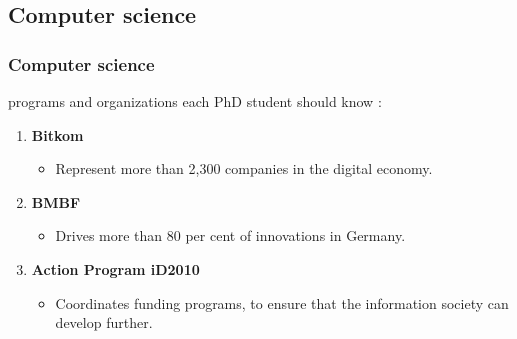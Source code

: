 \documentclass[9pt, compress]{beamer}
\begin{document}
    \subsection{Computer science} 
    \begin{frame} 
        \frametitle{Computer science}
        programs and organizations  each PhD student should know :
        \begin{enumerate}
            \setcounter{enumi}{0}
            \item \textbf{Bitkom}
            \begin{itemize}
                \item  Represent more than 2,300 companies in the digital economy.
            \end{itemize}
            \item \textbf{BMBF} 
            \begin{itemize}
                \item Drives more than 80 per cent of innovations in Germany.
            \end{itemize}
            \item \textbf{Action Program iD2010}
            \begin{itemize}
                \item Coordinates funding programs, to ensure that the information society can develop further.
            \end{itemize}
        \end{enumerate}
    \end{frame}
\end{document}
